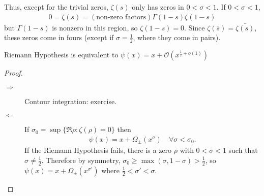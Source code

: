 \documentclass{article}
\newcommand{\1}{\mathbbm{1}}
\newcommand{\bigO}{\mathcal{O}}
\begin{document}
Thus, except for the trivial zeros, $\zeta(s)$ only has zeros in $0 < \sigma < 1$. If $0 < \sigma < 1$,
\begin{align*}
  0 = \zeta(s) = (\text{non-zero factors}) \Gamma(1-s) \zeta(1-s)
\end{align*}
but $\Gamma(1-s)$ is nonzero in this region, so $\zeta(1-s) = 0$.
Since $\zeta(\bar{s}) = \bar{\zeta(s)}$, these zeros come in fours (except if $\sigma = \frac{1}{2}$, where they come in pairs).
\begin{thm}
  Riemann Hypothesis is equivalent to $\psi(x) = x + \bigO(x^{\frac 12 + o(1)})$
\end{thm}
\begin{proof}\leavevmode
  \begin{description}
    \item[$\Rightarrow$] Contour integration: exercise.
    \item [$\Leftarrow$] If $\sigma_0 = \sup\{\Re \rho : \zeta(\rho)=0\}$ then
      \begin{align*}
        \psi(x) = x + \Omega_{\pm}(x^\sigma) \quad \forall \sigma < \sigma_0.
      \end{align*}
      If the Riemann Hypothesis fails, there is a zero $\rho$ with $0 < \sigma < 1$ such that $\sigma \neq \frac 12$. Therefore by symmetry, $\sigma_0 \geq \max(\sigma,1-\sigma) > \frac{1}{2}$, so $\psi(x) = x + \Omega_{\pm}(x^{\sigma'})$ where $\frac{1}{2} < \sigma' < \sigma$.
  \end{description}
\end{proof}

\clearpage
\printnomenclature
\printindex
\end{document}

